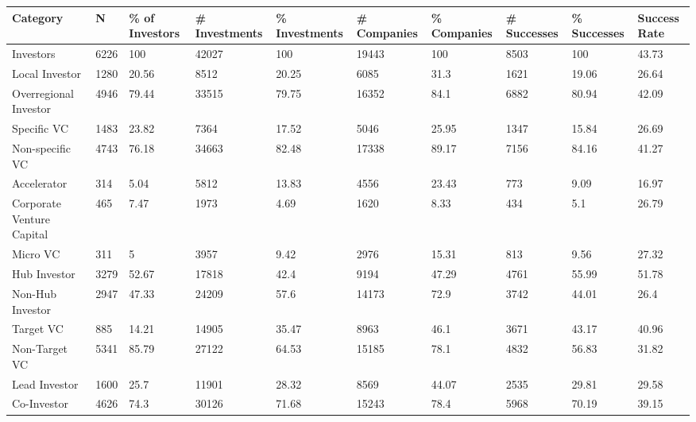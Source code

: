 \begin{tabular}{llllllllll}
  \toprule
Category & N & \% of Investors & # Investments & \% Investments & # Companies & \% Companies & # Successes & \% Successes & Success Rate \\ 
  \midrule
Investors & 6226 & 100 & 42027 & 100 & 19443 & 100 & 8503 & 100 & 43.73 \\ 
  Local Investor & 1280 & 20.56 & 8512 & 20.25 & 6085 & 31.3 & 1621 & 19.06 & 26.64 \\ 
  Overregional Investor & 4946 & 79.44 & 33515 & 79.75 & 16352 & 84.1 & 6882 & 80.94 & 42.09 \\ 
  Specific VC & 1483 & 23.82 & 7364 & 17.52 & 5046 & 25.95 & 1347 & 15.84 & 26.69 \\ 
  Non-specific VC & 4743 & 76.18 & 34663 & 82.48 & 17338 & 89.17 & 7156 & 84.16 & 41.27 \\ 
  Accelerator & 314 & 5.04 & 5812 & 13.83 & 4556 & 23.43 & 773 & 9.09 & 16.97 \\ 
  Corporate Venture Capital & 465 & 7.47 & 1973 & 4.69 & 1620 & 8.33 & 434 & 5.1 & 26.79 \\ 
  Micro VC & 311 & 5 & 3957 & 9.42 & 2976 & 15.31 & 813 & 9.56 & 27.32 \\ 
  Hub Investor & 3279 & 52.67 & 17818 & 42.4 & 9194 & 47.29 & 4761 & 55.99 & 51.78 \\ 
  Non-Hub Investor & 2947 & 47.33 & 24209 & 57.6 & 14173 & 72.9 & 3742 & 44.01 & 26.4 \\ 
  Target VC & 885 & 14.21 & 14905 & 35.47 & 8963 & 46.1 & 3671 & 43.17 & 40.96 \\ 
  Non-Target VC & 5341 & 85.79 & 27122 & 64.53 & 15185 & 78.1 & 4832 & 56.83 & 31.82 \\ 
  Lead Investor & 1600 & 25.7 & 11901 & 28.32 & 8569 & 44.07 & 2535 & 29.81 & 29.58 \\ 
  Co-Investor & 4626 & 74.3 & 30126 & 71.68 & 15243 & 78.4 & 5968 & 70.19 & 39.15 \\ 
   \bottomrule
\end{tabular}
